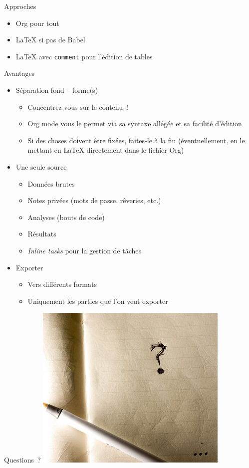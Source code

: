 \documentclass[presentation,t,hideothersubsections]{beamer}
\begin{document}
\begin{frame}[fragile,label=sec-7-1-1]{Approches}
 \begin{itemize}
\item Org pour tout
\item \LaTeX{} si pas de Babel
\item \LaTeX{} avec \texttt{comment} pour l'édition de tables
\end{itemize}
\end{frame}
\begin{frame}[label=sec-7-1-2]{Avantages}
\begin{itemize}
\item \alert{Séparation fond -- forme(s)}
\begin{itemize}
\item Concentrez-vous sur le contenu~!
\item Org mode vous le permet via sa syntaxe allégée et sa facilité d'édition
\item Si des choses doivent être fixées, faites-le à la fin (éventuellement, en
le mettant en \LaTeX{} directement dans le fichier Org)
\end{itemize}

\item \alert{Une seule source}
\begin{itemize}
\item Données brutes
\item Notes privées (mots de passe, rêveries, etc.)
\item Analyses (bouts de code)
\item Résultats
\item \emph{Inline tasks} pour la gestion de tâches
\end{itemize}

\item Exporter
\begin{itemize}
\item Vers différents formats
\item Uniquement les parties que l'on veut exporter
\end{itemize}
\end{itemize}
\end{frame}
\begin{frame}[label=sec-7-1-3]{Questions~?}
\includegraphics[width=.9\linewidth]{questions.png}
\end{frame}
\end{document}
